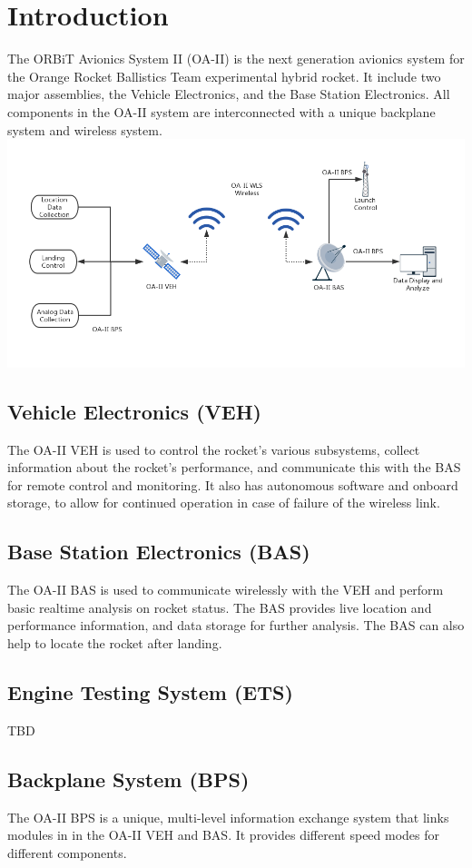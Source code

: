 \documentclass[12pt,article]{memoir}
\begin{document}
\section{Introduction}
The ORBiT Avionics System II (OA-II) is the next generation avionics system for the Orange Rocket Ballistics Team experimental hybrid rocket. It include two major assemblies, the Vehicle Electronics, and the Base Station Electronics. All components in the OA-II system are interconnected with a unique backplane system and wireless system.\\
\includegraphics[width=\textwidth]{sys_diag.png}
\subsection{Vehicle Electronics (VEH)}
The OA-II VEH is used to control the rocket's various subsystems, collect information about the rocket's performance, and communicate this with the BAS for remote control and monitoring. It also has autonomous software and onboard storage, to allow for continued operation in case of failure of the wireless link.
\subsection{Base Station Electronics (BAS)}
The OA-II BAS is used to communicate wirelessly with the VEH and perform basic realtime analysis on rocket status. The BAS provides live location and performance information, and data storage for further analysis. The BAS can also help to locate the rocket after landing.
\subsection{Engine Testing System (ETS)}
TBD
\subsection{Backplane System (BPS)}
The OA-II BPS is a unique, multi-level information exchange system that links modules in in the OA-II VEH and BAS. It provides different speed modes for different components.
\end{document}
